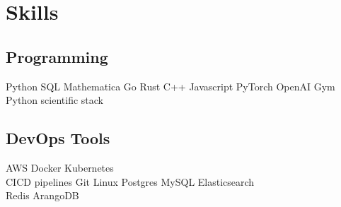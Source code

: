 \documentclass[]{deedy-resume-openfont}
\begin{document}
\begin{minipage}[t]{0.33\textwidth}


 \section{Skills}
 \subsection{Programming}
 Python \textbullet{} SQL \textbullet{} Mathematica
 Go \textbullet{} Rust \textbullet{} C++ \textbullet{} Javascript
 PyTorch \textbullet{} OpenAI Gym \textbullet{} Python scientific stack

\sectionsep
\subsection{DevOps Tools}
AWS \textbullet{} Docker \textbullet{} Kubernetes \\
CICD pipelines \textbullet{} Git \textbullet{} Linux
Postgres \textbullet{} MySQL \textbullet{} Elasticsearch \\
Redis \textbullet{} ArangoDB
\sectionsep

%



%
%

\end{minipage} 
\end{document}
